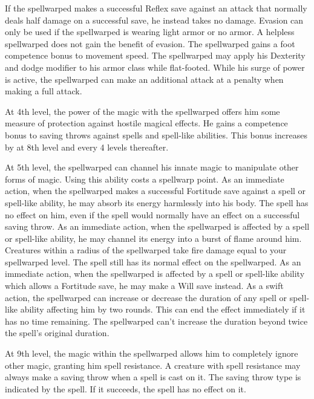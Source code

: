  If the spellwarped makes a successful Reflex save against an attack that normally deals half damage on a successful save, he instead takes no damage. Evasion can only be used if the spellwarped is wearing light armor or no armor. A helpless spellwarped does not gain the benefit of evasion.
 The spellwarped gains a  foot competence bonus to movement speed.
 The spellwarped may apply his Dexterity and dodge modifier to his armor class while flat-footed.
 While his surge of power is active, the spellwarped can make an additional attack at a  penalty when making a full attack.

 At 4th level, the power of the magic with the spellwarped offers him some measure of protection against hostile magical effects. He gains a  competence bonus to saving throws against spells and spell-like abilities. This bonus increases by  at 8th level and every 4 levels thereafter.

 At 5th level, the spellwarped can channel his innate magic to manipulate other forms of magic. Using this ability costs a spellwarp point. 
 As an immediate action, when the spellwarped makes a successful Fortitude save against a spell or spell-like ability, he may absorb its energy harmlessly into his body. The spell has no effect on him, even if the spell would normally have an effect on a successful saving throw.
 As an immediate action, when the spellwarped is affected by a spell or spell-like ability, he may channel its energy into a burst of flame around him. Creatures within a \areasmall radius of the spellwarped take fire damage equal to your spellwarped level. The spell still has its normal effect on the spellwarped.
 As an immediate action, when the spellwarped is affected by a spell or spell-like ability which allows a Fortitude save, he may make a Will save instead.
 As a swift action, the spellwarped can increase or decrease the duration of any spell or spell-like ability affecting him by two rounds. This can end the effect immediately if it has no time remaining. The spellwarped can't increase the duration beyond twice the spell's original duration.

 At 9th level, the magic within the spellwarped allows him to completely ignore other magic, granting him spell resistance. A creature with spell resistance may always make a saving throw when a spell is cast on it. The saving throw type is indicated by the spell. If it succeeds, the spell has no effect on it.

